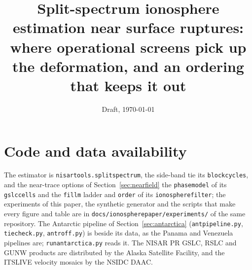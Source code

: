 \documentclass[11pt]{article}
\title{Split-spectrum ionosphere estimation near surface ruptures:\\
where operational screens pick up the deformation, and an ordering that keeps it out}
\author{\tbd{authors}}
\date{Draft, \today}
\DeclareRobustCommand{\_}{\textunderscore\allowbreak}
\begin{document}
\maketitle













\section*{Code and data availability}
The estimator is \texttt{nisar\_tools.split\_spectrum}, the side-band tie its \texttt{block\_cycles}, and the
near-trace options of Section~\ref{sec:nearfield} the \texttt{phase\_model} of its \texttt{gslc\_cells} and the
\texttt{fill\_m} ladder and \texttt{order} of its \texttt{ionosphere\_filter}; the
experiments of this paper, the synthetic generator and the
scripts that make every figure and table are in \texttt{docs/\allowbreak ionosphere\_paper/\allowbreak experiments/} of the
same repository.
The Antarctic pipeline of Section~\ref{sec:antarctica} (\texttt{ant\_pipeline.py}, \texttt{tie\_check.py},
\texttt{ant\_roff.py}) is beside its data, as the Panama and Venezuela pipelines are; \texttt{run\_antarctica.py} reads
it. The NISAR PR GSLC, RSLC and GUNW products are distributed by the Alaska Satellite Facility, and the ITS\_LIVE
velocity mosaics by the NSIDC DAAC.




\appendix

\end{document}
